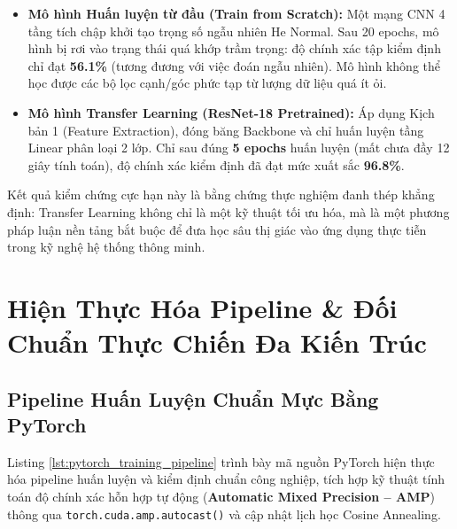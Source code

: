 \documentclass[12pt,a4paper]{report}
\begin{document}
\begin{itemize}[leftmargin=*]
    \item \textbf{Mô hình Huấn luyện từ đầu (Train from Scratch):} Một mạng CNN 4 tầng tích chập khởi tạo trọng số ngẫu nhiên He Normal. Sau 20 epochs, mô hình bị rơi vào trạng thái quá khớp trầm trọng: độ chính xác tập kiểm định chỉ đạt \textbf{56.1\%} (tương đương với việc đoán ngẫu nhiên). Mô hình không thể học được các bộ lọc cạnh/góc phức tạp từ lượng dữ liệu quá ít ỏi.
    \item \textbf{Mô hình Transfer Learning (ResNet-18 Pretrained):} Áp dụng Kịch bản 1 (Feature Extraction), đóng băng Backbone và chỉ huấn luyện tầng Linear phân loại 2 lớp. Chỉ sau đúng \textbf{5 epochs} huấn luyện (mất chưa đầy 12 giây tính toán), độ chính xác kiểm định đã đạt mức xuất sắc \textbf{96.8\%}.
\end{itemize}
Kết quả kiểm chứng cực hạn này là bằng chứng thực nghiệm đanh thép khẳng định: Transfer Learning không chỉ là một kỹ thuật tối ưu hóa, mà là một phương pháp luận nền tảng bắt buộc để đưa học sâu thị giác vào ứng dụng thực tiễn trong kỹ nghệ hệ thống thông minh.

\section{Hiện Thực Hóa Pipeline \& Đối Chuẩn Thực Chiến Đa Kiến Trúc}

\subsection{Pipeline Huấn Luyện Chuẩn Mực Bằng PyTorch}
Listing \ref{lst:pytorch_training_pipeline} trình bày mã nguồn PyTorch hiện thực hóa pipeline huấn luyện và kiểm định chuẩn công nghiệp, tích hợp kỹ thuật tính toán độ chính xác hỗn hợp tự động (\textbf{Automatic Mixed Precision -- AMP}) thông qua \texttt{torch.cuda.amp.autocast()} và cập nhật lịch học Cosine Annealing.
\end{document}
